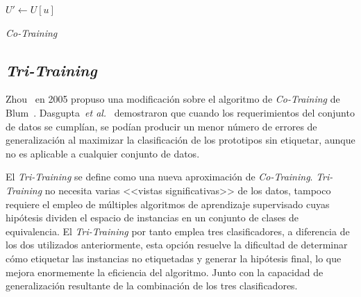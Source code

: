 \begin{algorithm}[H]
  	\BlankLine
  	$U' \leftarrow U[u]$\\
	\caption{\textit{Co-Training}}\label{alg:Co-Training}
\end{algorithm}

\subsection{\textit{Tri-Training}}
Zhou~\cite{zhou2005tri} en 2005 propuso una modificación sobre el algoritmo de \textit{Co-Training} de Blum~\cite{blum1998combining}. Dasgupta~\textit{et al.}~\cite{dasgupta2002pac} demostraron que cuando los requerimientos del conjunto de datos se cumplían, se podían producir un menor número de errores de generalización al maximizar la clasificación de los prototipos sin etiquetar, aunque no es aplicable a cualquier conjunto de datos.

El \textit{Tri-Training} se define como una nueva aproximación de \textit{Co-Training}. \textit{Tri-Training} no necesita varias <<vistas significativas>> de los datos, tampoco requiere el empleo de múltiples algoritmos de aprendizaje supervisado cuyas hipótesis dividen el espacio de instancias en un conjunto de clases de equivalencia. El \textit{Tri-Training} por tanto emplea tres clasificadores, a diferencia de los dos utilizados anteriormente, esta opción resuelve la dificultad de determinar cómo etiquetar las instancias no etiquetadas y generar la hipótesis final, lo que mejora enormemente la eficiencia del algoritmo. Junto con la capacidad de generalización resultante de la combinación de los tres clasificadores.


